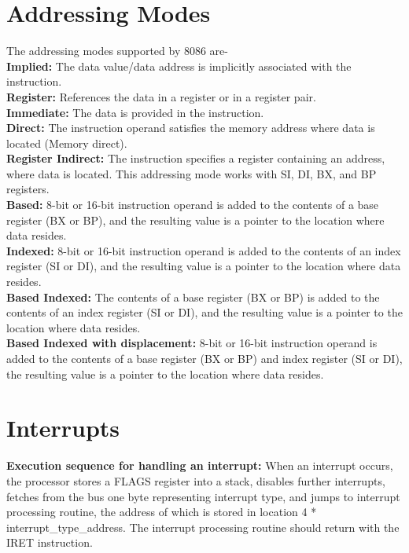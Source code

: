 \documentclass[12pt, a4paper]{scrartcl}
\begin{document}
\section{Addressing Modes}
	The addressing modes supported by 8086 are-\\

	\textbf{Implied: }The data value/data address is implicitly associated with the instruction. \\

	\textbf{Register: }References the data in a register or in a register pair. \\

	\textbf{Immediate: }The data is provided in the instruction.\\

	\textbf{Direct: }The instruction operand satisfies the memory address where data is located (Memory direct). \\

	\textbf{Register Indirect: }The instruction specifies a register containing an address, where data is located. This addressing mode works with SI, DI, BX, and BP registers.\\

	\textbf{Based: }8-bit or 16-bit instruction operand is added to the contents of a base register (BX or BP), and the resulting value is a pointer to the location where data resides. \\

	\textbf{Indexed: }8-bit or 16-bit instruction operand is added to the contents of an index register (SI or DI), and the resulting value is a pointer to the location where data resides. \\

	\textbf{Based Indexed: }The contents of a base register (BX or BP) is added to the contents of an index register (SI or DI), and the resulting value is a pointer to the location where data resides. \\

	\textbf{Based Indexed with displacement: }8-bit or 16-bit instruction operand is added to the contents of a base register (BX or BP) and index register (SI or DI), the resulting value is a pointer to the location where data resides.\\

\section{Interrupts}
	\textbf{Execution sequence for handling an interrupt: }When an interrupt occurs, the processor stores a FLAGS register into a stack, disables further interrupts, fetches from the bus one byte representing interrupt type, and jumps to interrupt processing routine, the address of which is stored in location 4 * interrupt\_type\_address. The interrupt processing routine should return with the IRET instruction. \\
\end{document}

